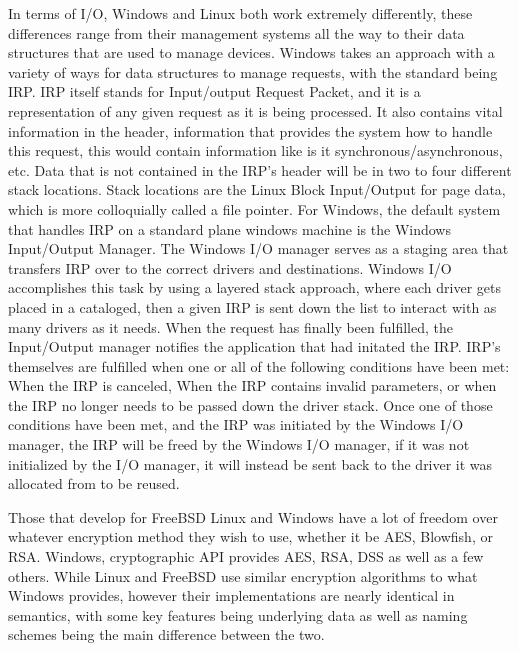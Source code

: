 \documentclass[letterpaper,10pt,fleqn,draftclsnofoot,onecolumn]{IEEEtran}
\begin{document}
In terms of I/O, Windows and Linux both work extremely differently, these differences range from their management systems all the way to their data structures that are used to manage devices. Windows takes an approach with a variety of ways for data structures to manage requests, with the standard being IRP\cite{Understa77:online}. IRP itself stands for Input/output Request Packet, and it is a representation of any given request as it is being processed. It also contains vital information in the header, information that provides the system how to handle this request, this would contain information like is it synchronous/asynchronous, etc.  Data that is not contained in the IRP’s header will be in two to four different stack locations. Stack locations are the Linux Block Input/Output for page data, which is more colloquially called a file pointer. For Windows, the default system that handles IRP on a standard plane windows machine is the Windows Input/Output Manager. The Windows I/O manager serves as a staging area that transfers IRP over to the correct drivers and destinations.  Windows I/O accomplishes this task by using a layered stack approach, where each driver gets placed in a cataloged, then a given IRP is sent down the list to interact with as many drivers as it needs.  When the request has finally been fulfilled, the Input/Output manager notifies the application that had initated the IRP. IRP’s themselves are fulfilled when one or all of the following conditions have been met: When the IRP is canceled, When the IRP contains invalid parameters, or when the IRP no longer needs to be passed down the driver stack\cite{WhentoCo44:online}. Once one of those conditions have been met, and the IRP was initiated by the Windows I/O manager, the IRP will be freed by the Windows I/O manager, if it was not initialized by the I/O manager, it will instead be  sent back to the driver it was allocated from to be reused.

Those that develop for FreeBSD Linux and Windows have a lot of freedom over whatever encryption method they wish to use, whether it be AES, Blowfish, or RSA. Windows, cryptographic API provides AES, RSA, DSS as well as a few others\cite{Cryptogr64:online}. While Linux and FreeBSD use similar encryption algorithms to what Windows provides, however their implementations are nearly identical in semantics, with some key features being underlying data as well as naming schemes being the main difference between the two.
\end{document}
